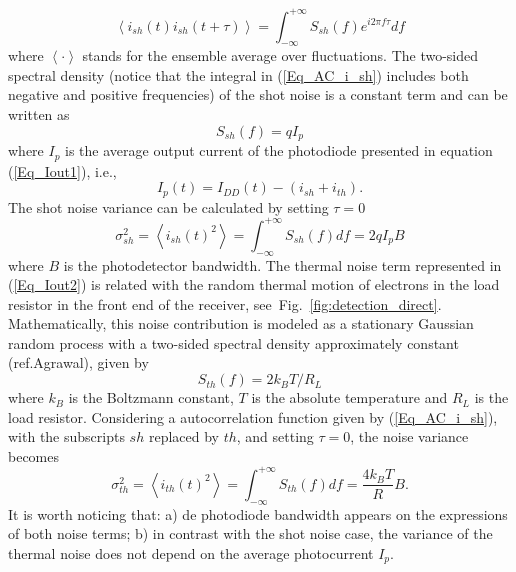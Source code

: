 \begin{equation}\label{Eq_AC_i_sh}
    \left<i_{sh}(t)i_{sh}(t+\tau)\right> = \int_{-\infty}^{+\infty}S_{sh}(f)e^{i2\pi f\tau}df
\end{equation}
where $\left<\cdot\right>$ stands for the ensemble average over fluctuations. The two-sided spectral density (notice that the integral in (\ref{Eq_AC_i_sh}) includes both negative and positive frequencies) of the shot noise is a constant term and can be written as
\begin{equation}\label{Eq_SD_i_sh}
    S_{sh}(f)=q I_p
\end{equation}
where $I_p$ is the average output current of the photodiode presented in equation (\ref{Eq_Iout1}), i.e., 
\begin{equation}\label{Eq_I_p}
I_p(t) = I_{DD}(t) -(i_{sh}+i_{th}).
 \end{equation}
The shot noise variance can be calculated by setting $\tau=0$
\begin{equation}\label{Eq_Var_i_sh}
    \sigma^2_{sh} =  \left<i_{sh}(t)^2\right> = \int_{-\infty}^{+\infty}S_{sh}(f)df = 2 q I_p B
\end{equation}
where $B$ is the photodetector bandwidth.  The thermal noise term represented in (\ref{Eq_Iout2}) is related with the random thermal motion of electrons in the load resistor in the front end of the receiver, see~Fig.~\ref{fig:detection_direct}. Mathematically, this noise contribution is modeled as a stationary Gaussian random process with a two-sided spectral density approximately constant (ref.Agrawal), given by
\begin{equation}\label{Eq_SD_i_th}
    S_{th}(f)= 2 k_B T/R_L
\end{equation}
where $k_B$ is the Boltzmann constant, $T$ is the absolute temperature and $R_L$ is the load resistor. Considering a autocorrelation function given by (\ref{Eq_AC_i_sh}), with the subscripts $sh$ replaced by $th$, and setting $\tau=0$, the noise variance becomes
\begin{equation}\label{Eq_Var_i_th}
    \sigma^2_{th} =  \left<i_{th}(t)^2\right> = \int_{-\infty}^{+\infty}S_{th}(f)df = \frac{4 k_B T}{R} B.
\end{equation}
It is worth noticing that: a) de photodiode bandwidth appears on the expressions of both noise terms; b) in contrast with the shot noise case, the variance of the thermal noise does not depend on the average photocurrent $I_p$.

